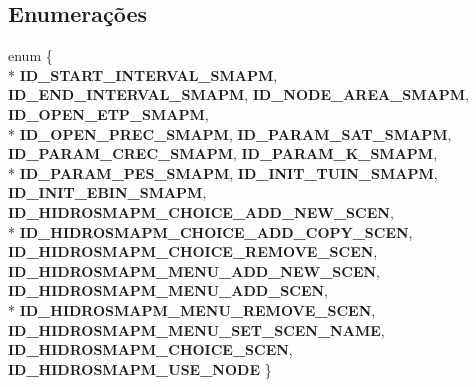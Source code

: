 \subsection*{Enumerações}
\begin{DoxyCompactItemize}
\item 
enum \{ \\*
{\bf I\+D\+\_\+\+S\+T\+A\+R\+T\+\_\+\+I\+N\+T\+E\+R\+V\+A\+L\+\_\+\+S\+M\+A\+PM}, 
{\bf I\+D\+\_\+\+E\+N\+D\+\_\+\+I\+N\+T\+E\+R\+V\+A\+L\+\_\+\+S\+M\+A\+PM}, 
{\bf I\+D\+\_\+\+N\+O\+D\+E\+\_\+\+A\+R\+E\+A\+\_\+\+S\+M\+A\+PM}, 
{\bf I\+D\+\_\+\+O\+P\+E\+N\+\_\+\+E\+T\+P\+\_\+\+S\+M\+A\+PM}, 
\\*
{\bf I\+D\+\_\+\+O\+P\+E\+N\+\_\+\+P\+R\+E\+C\+\_\+\+S\+M\+A\+PM}, 
{\bf I\+D\+\_\+\+P\+A\+R\+A\+M\+\_\+\+S\+A\+T\+\_\+\+S\+M\+A\+PM}, 
{\bf I\+D\+\_\+\+P\+A\+R\+A\+M\+\_\+\+C\+R\+E\+C\+\_\+\+S\+M\+A\+PM}, 
{\bf I\+D\+\_\+\+P\+A\+R\+A\+M\+\_\+\+K\+\_\+\+S\+M\+A\+PM}, 
\\*
{\bf I\+D\+\_\+\+P\+A\+R\+A\+M\+\_\+\+P\+E\+S\+\_\+\+S\+M\+A\+PM}, 
{\bf I\+D\+\_\+\+I\+N\+I\+T\+\_\+\+T\+U\+I\+N\+\_\+\+S\+M\+A\+PM}, 
{\bf I\+D\+\_\+\+I\+N\+I\+T\+\_\+\+E\+B\+I\+N\+\_\+\+S\+M\+A\+PM}, 
{\bf I\+D\+\_\+\+H\+I\+D\+R\+O\+S\+M\+A\+P\+M\+\_\+\+C\+H\+O\+I\+C\+E\+\_\+\+A\+D\+D\+\_\+\+N\+E\+W\+\_\+\+S\+C\+EN}, 
\\*
{\bf I\+D\+\_\+\+H\+I\+D\+R\+O\+S\+M\+A\+P\+M\+\_\+\+C\+H\+O\+I\+C\+E\+\_\+\+A\+D\+D\+\_\+\+C\+O\+P\+Y\+\_\+\+S\+C\+EN}, 
{\bf I\+D\+\_\+\+H\+I\+D\+R\+O\+S\+M\+A\+P\+M\+\_\+\+C\+H\+O\+I\+C\+E\+\_\+\+R\+E\+M\+O\+V\+E\+\_\+\+S\+C\+EN}, 
{\bf I\+D\+\_\+\+H\+I\+D\+R\+O\+S\+M\+A\+P\+M\+\_\+\+M\+E\+N\+U\+\_\+\+A\+D\+D\+\_\+\+N\+E\+W\+\_\+\+S\+C\+EN}, 
{\bf I\+D\+\_\+\+H\+I\+D\+R\+O\+S\+M\+A\+P\+M\+\_\+\+M\+E\+N\+U\+\_\+\+A\+D\+D\+\_\+\+S\+C\+EN}, 
\\*
{\bf I\+D\+\_\+\+H\+I\+D\+R\+O\+S\+M\+A\+P\+M\+\_\+\+M\+E\+N\+U\+\_\+\+R\+E\+M\+O\+V\+E\+\_\+\+S\+C\+EN}, 
{\bf I\+D\+\_\+\+H\+I\+D\+R\+O\+S\+M\+A\+P\+M\+\_\+\+M\+E\+N\+U\+\_\+\+S\+E\+T\+\_\+\+S\+C\+E\+N\+\_\+\+N\+A\+ME}, 
{\bf I\+D\+\_\+\+H\+I\+D\+R\+O\+S\+M\+A\+P\+M\+\_\+\+C\+H\+O\+I\+C\+E\+\_\+\+S\+C\+EN}, 
{\bf I\+D\+\_\+\+H\+I\+D\+R\+O\+S\+M\+A\+P\+M\+\_\+\+U\+S\+E\+\_\+\+N\+O\+DE}
 \}
\end{DoxyCompactItemize}

